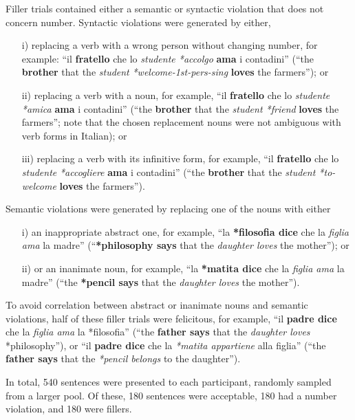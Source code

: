 Filler trials contained either a semantic or syntactic violation that does not concern number. 
Syntactic violations were generated by either, \begin{itemize}\setlength\itemsep{0mm}
\item [i)] replacing a verb with a wrong person without changing number, for example: ``il \textbf{fratello} che lo \emph{studente *accolgo} \textbf{ama} i contadini'' (``the \textbf{brother} that the \emph{student} \emph{*welcome-1st-pers-sing} \textbf{loves} the farmers''); or
\item[ii)] replacing a verb with a noun, for example, ``il \textbf{fratello} che lo \emph{studente} \emph{*amica} \textbf{ama} i contadini'' (``the \textbf{brother} that the \emph{student *friend} \textbf{loves} the farmers''; note that the chosen replacement nouns were not ambiguous with verb forms in Italian); or 
\item[iii)] replacing a verb with its infinitive form, for example, ``il \textbf{fratello} che lo \emph{studente} \emph{*accogliere} \textbf{ama} i contadini'' (``the \textbf{brother} that the \emph{student *to-welcome} \textbf{loves} the farmers''). 
\end{itemize}
Semantic violations were generated by replacing one of the nouns with either\begin{itemize}\setlength\itemsep{0mm}
\item[i)] an inappropriate abstract one, for example, ``la \textbf{*filosofia dice} che la \emph{figlia ama} la madre'' (``\textbf{*philosophy says} that the \emph{daughter loves} the mother''); or
\item[ii)] or an inanimate noun, for example, ``la \textbf{*matita dice} che la \emph{figlia ama} la madre'' (``the \textbf{*pencil says} that the \emph{daughter loves} the mother''). 
\end{itemize}

To avoid correlation between abstract or inanimate nouns and semantic violations, half of these filler trials were felicitous, for example, ``il \textbf{padre dice} che la \emph{figlia ama} la *filosofia'' (``the \textbf{father says} that the \emph{daughter loves} *philosophy''), or ``il \textbf{padre dice} che la \emph{*matita appartiene} alla figlia'' (``the \textbf{father says} that the \emph{*pencil belongs} to the daughter'').

In total, 540 sentences were presented to each participant, randomly sampled from a larger pool. Of these, 180 sentences were acceptable, 180 had a number violation, and 180 were fillers.

